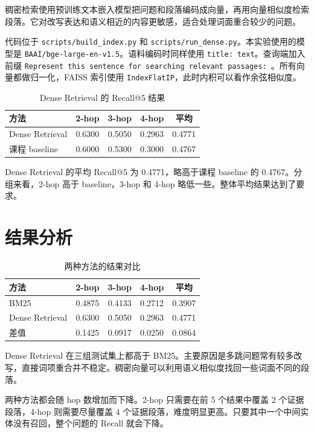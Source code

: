 \documentclass[12pt,letterpaper]{article}
\begin{document}
稠密检索使用预训练文本嵌入模型把问题和段落编码成向量，再用向量相似度检索段落。它对改写表达和语义相近的内容更敏感，适合处理词面重合较少的问题。

代码位于 \texttt{scripts/build\_index.py} 和 \texttt{scripts/run\_dense.py}。本实验使用的模型是 \texttt{BAAI/bge-large-en-v1.5}。语料编码时同样使用 \texttt{title: text}。查询端加入前缀 \texttt{Represent this sentence for searching relevant passages: }。所有向量都做归一化，FAISS 索引使用 \texttt{IndexFlatIP}，此时内积可以看作余弦相似度。

\begin{table}[H]
\centering
\begin{tabular}{lcccc}
\toprule
方法 & 2-hop & 3-hop & 4-hop & 平均 \\
\midrule
Dense Retrieval & 0.6300 & 0.5050 & 0.2963 & 0.4771 \\
课程 baseline & 0.6000 & 0.5300 & 0.3000 & 0.4767 \\
\bottomrule
\end{tabular}
\caption{Dense Retrieval 的 Recall@5 结果}
\end{table}

Dense Retrieval 的平均 Recall@5 为 0.4771，略高于课程 baseline 的 0.4767。分组来看，2-hop 高于 baseline，3-hop 和 4-hop 略低一些。整体平均结果达到了要求。

\section{结果分析}

\begin{table}[H]
\centering
\begin{tabular}{lcccc}
\toprule
方法 & 2-hop & 3-hop & 4-hop & 平均 \\
\midrule
BM25 & 0.4875 & 0.4133 & 0.2712 & 0.3907 \\
Dense Retrieval & 0.6300 & 0.5050 & 0.2963 & 0.4771 \\
差值 & 0.1425 & 0.0917 & 0.0250 & 0.0864 \\
\bottomrule
\end{tabular}
\caption{两种方法的结果对比}
\end{table}

Dense Retrieval 在三组测试集上都高于 BM25。主要原因是多跳问题常有较多改写，直接词项重合并不稳定。稠密向量可以利用语义相似度找回一些词面不同的段落。

两种方法都会随 hop 数增加而下降。2-hop 只需要在前 5 个结果中覆盖 2 个证据段落，4-hop 则需要尽量覆盖 4 个证据段落，难度明显更高。只要其中一个中间实体没有召回，整个问题的 Recall 就会下降。
\end{document}
